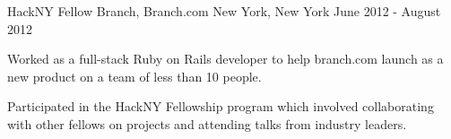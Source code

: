 \begin{cventries}

	\cventry
	{HackNY Fellow}
	{Branch, Branch.com}
	{New York, New York}
	{June 2012 - August 2012}
	{
		\begin{cvitems}
		\item {Worked as a full-stack Ruby on Rails developer to help branch.com launch as a new product on a team of less than 10 people.}
		\item {Participated in the HackNY Fellowship program which involved collaborating with other fellows on projects and attending talks from industry leaders.}
		\end{cvitems}
	}

\end{cventries}
